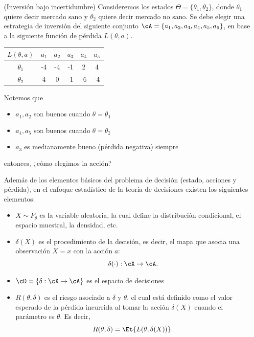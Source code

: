 \begin{example}(Inversión bajo incertidumbre)
	Consideremos los estados $\Theta = \{\theta_1,\theta_2\}$, donde $\theta_1$ quiere decir mercado sano y $\theta_2$ quiere decir mercado no sano. Se debe elegir una estrategia de inversión del siguiente conjunto $\cA=\{a_1,a_2,a_3,a_4,a_5,a_6\}$, en base a la siguiente función de pérdida $L(\theta,a)$.
	\begin{table}[ht]
		\centering
		\begin{tabular}{c|c|c|c|c|c}
			$L(\theta,a)$   & $a_1$ & $a_2$ & $a_3$ & $a_4$ & $a_5$ \\
			\hline
			$\theta_1$ & -4   & -4   & -1   & 2    & 4    \\
			$\theta_2$  & 4    & 0    & -1   & -6   & -4
		\end{tabular}
	\end{table} 

	Notemos que \begin{itemize}
		\item $a_1, a_2$ son buenos  cuando $\theta=\theta_1$
		\item $a_4,a_5$ son buenos cuando $\theta=\theta_2$
		\item $a_3$ es medianamente bueno (pérdida negativa) siempre
	\end{itemize}
	entonces, ¿cómo elegimos la acción?
\end{example}

Además de los elementos básicos del problema de decisión (estado, acciones y pérdida), en el enfoque estadístico de la teoría de decisiones existen los siguientes elementos:
\begin{itemize}
	\item $X\sim P_\theta$ es la variable aleatoria, la cual define la distribución condicional, el espacio muestral, la densidad, etc. 
	\item $\delta(X)$ es el procedimiento de la decisión, es decir, el mapa que asocia una observación $X=x$ con la acción $a$:
	\begin{equation}
		\delta(\cdot):\cX\rightarrow\cA.
	\end{equation}
	\item $\cD=\{\delta:\cX\rightarrow\cA\}$ es el espacio de decisiones
	\item $R(\theta,\delta)$ es el riesgo asociado a $\delta$ y $\theta$, el cual está definido como el valor esperado de la pérdida incurrida al tomar la acción $\delta(X)$ cuando el parámetro es $\theta$. Es decir, 
	\begin{equation}
	 	R(\theta,\delta) = \Et{L(\theta,\delta(X))}.
	 \end{equation} 
\end{itemize}


